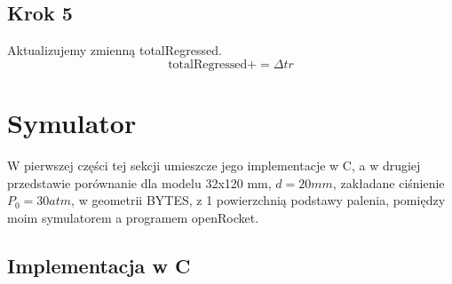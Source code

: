 \documentclass{article}
\begin{document}
\subsection*{Krok 5}
Aktualizujemy zmienną totalRegressed.
$$\mbox{totalRegressed} +=\Delta t r$$
\newpage
\section{Symulator}
W pierwszej części tej sekcji umieszcze jego implementacje w C, a w drugiej przedstawie porównanie dla modelu 32x120 mm, $d=20mm$, zakładane ciśnienie $P_0=30atm$, w geometrii BYTES, z 1 powierzchnią podstawy palenia, pomiędzy moim symulatorem a programem openRocket.
\subsection*{Implementacja w C}
\end{document}
